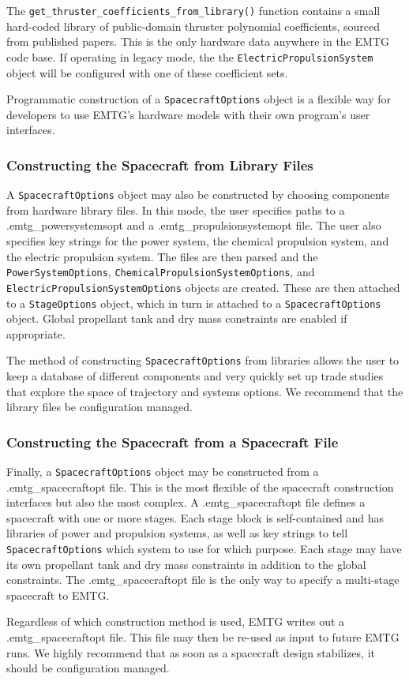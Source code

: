 The \texttt{get\_thruster\_coefficients\_from\_library()} function contains a small hard-coded library of public-domain thruster polynomial coefficients, sourced from published papers. This is the only hardware data anywhere in the \ac{EMTG} code base. If operating in legacy mode, the the \texttt{ElectricPropulsionSystem} object will be configured with one of these coefficient sets.

Programmatic construction of a \texttt{SpacecraftOptions} object is a flexible way for developers to use \ac{EMTG}'s hardware models with their own program's user interfaces.

\subsubsection{Constructing the Spacecraft from Library Files}
\label{subsubsec:construct_spacecraft_library_files}

A \texttt{SpacecraftOptions} object may also be constructed by choosing components from hardware library files. In this mode, the user specifies paths to a .emtg\_powersystemsopt and a .emtg\_propulsionsystemopt file. The user also specifies key strings for the power system, the chemical propulsion system, and the electric propulsion system. The files are then parsed and the \texttt{PowerSystemOptions}, \texttt{ChemicalPropulsionSystemOptions}, and \texttt{ElectricPropulsionSystemOptions} objects are created. These are then attached to a \texttt{StageOptions} object, which in turn is attached to a \texttt{SpacecraftOptions} object. Global propellant tank and dry mass constraints are enabled if appropriate.

The method of constructing \texttt{SpacecraftOptions} from libraries allows the user to keep a database of different components and very quickly set up trade studies that explore the space of trajectory and systems options. We recommend that the library files be configuration managed.

\subsubsection{Constructing the Spacecraft from a Spacecraft File}
\label{subsubsec:construct_spacecraft_from_file}

Finally, a \texttt{SpacecraftOptions} object may be constructed from a .emtg\_spacecraftopt file. This is the most flexible of the spacecraft construction interfaces but also the most complex. A .emtg\_spacecraftopt file defines a spacecraft with one or more stages. Each stage block is self-contained and has libraries of power and propulsion systems, as well as key strings to tell \texttt{SpacecraftOptions} which system to use for which purpose. Each stage may have its own propellant tank and dry mass constraints in addition to the global constraints. The .emtg\_spacecraftopt file is the only way to specify a multi-stage spacecraft to \ac{EMTG}.

Regardless of which construction method is used, \ac{EMTG} writes out a .emtg\_spacecraftopt file. This file may then be re-used as input to future \ac{EMTG} runs. We highly recommend that as soon as a spacecraft design stabilizes, it should be configuration managed.